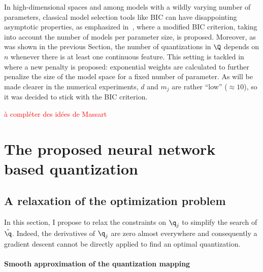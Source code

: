 In high-dimensional spaces and among models with a wildly varying number of parameters, classical model selection tools like BIC can have disappointing asymptotic properties, as emphasized in~\cite{chen2008extended}, where a modified BIC criterion, taking into account the number of models per parameter size, is proposed. Moreover, as was shown in the previous Section, the number of quantizations in $\Q$ depends on $n$ whenever there is at least one continuous feature. This setting is tackled in~\cite{} where a new penalty is proposed: exponential weights are calculated to further penalize the size of the model space for a fixed number of parameter. As will be made clearer in the numerical experiments, $d$ and $m_j$ are rather ``low'' ($\approx 10$), so it was decided to stick with the BIC criterion.


\textcolor{red}{à compléter des idées de Massart}

\section{The proposed neural network based quantization}
\label{sec:proposal}

\subsection{A relaxation of the optimization problem} \label{subsec:relaxation}

In this section, I propose to relax the constraints on $\q_j$ to simplify the search of $\hat{\q}$. Indeed, the derivatives of $\q_j$ are zero almost everywhere and consequently a gradient descent cannot be directly applied to find an optimal quantization.

\paragraph{Smooth approximation of the quantization mapping}

